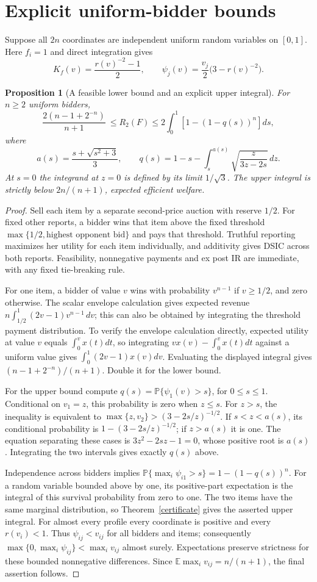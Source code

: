 \documentclass[11pt]{article}
\newtheorem{proposition}[theorem]{Proposition}
\theoremstyle{definition}
\newcommand{\E}{\mathbb E}
\newcommand{\Prb}{\mathbb P}
\begin{document}
\section{Explicit uniform-bidder bounds}
Suppose all $2n$ coordinates are independent uniform random variables on
$[0,1]$. Here $f_i=1$ and direct integration gives
\[
 K_f(v)=\frac{r(v)^{-2}-1}{2},\qquad
 \psi_j(v)=\frac{v_j}{2}\bigl(3-r(v)^{-2}\bigr).
\]
\begin{proposition}[A feasible lower bound and an explicit upper integral]
For $n\ge2$ uniform bidders,
\[
 \frac{2(n-1+2^{-n})}{n+1}\ \le R_2(F)\le
 2\int_0^1\left[1-(1-q(s))^n\right]ds,
\]
where
\[
 a(s)=\frac{s+\sqrt{s^2+3}}3,
 \qquad q(s)=1-s-\int_s^{a(s)}\sqrt{\frac{z}{3z-2s}}\,dz.
\]
At $s=0$ the integrand at $z=0$ is defined by its limit $1/\sqrt3$.
The upper integral is strictly below $2n/(n+1)$, expected efficient welfare.
\end{proposition}
\begin{proof}
Sell each item by a separate second-price auction with reserve $1/2$.
For fixed other reports, a bidder wins that item above the fixed threshold
$\max\{1/2,\text{highest opponent bid}\}$ and pays that threshold.
Truthful reporting maximizes her utility for each item individually,
and additivity gives DSIC across both reports. Feasibility, nonnegative
payments and ex post IR are immediate, with any fixed tie-breaking rule.

For one item, a bidder of value $v$ wins with probability $v^{n-1}$ if
$v\ge1/2$, and zero otherwise. The scalar envelope calculation gives
expected revenue $n\int_{1/2}^1(2v-1)v^{n-1}\,dv$; this can also be
obtained by integrating the threshold payment distribution. To verify
the envelope calculation directly, expected utility at value $v$ equals
$\int_0^v x(t)dt$, so integrating $vx(v)-\int_0^v x(t)dt$ against a
uniform value gives $\int_0^1(2v-1)x(v)dv$. Evaluating the displayed
integral gives $(n-1+2^{-n})/(n+1)$. Double it for the lower bound.

For the upper bound compute $q(s)=\Prb\{\psi_1(v)>s\}$, for $0\le s\le1$.
Conditional on $v_1=z$, this probability is zero when $z\le s$.
For $z>s$, the inequality is equivalent to
$\max\{z,v_2\}>(3-2s/z)^{-1/2}$. If $s<z<a(s)$, its conditional
probability is $1-(3-2s/z)^{-1/2}$; if $z>a(s)$ it is one.
The equation separating these cases is $3z^2-2sz-1=0$, whose positive
root is $a(s)$. Integrating the two intervals gives exactly $q(s)$ above.

Independence across bidders implies
$\Prb\{\max_i\psi_{i1}>s\}=1-(1-q(s))^n$.
For a random variable bounded above by one, its positive-part expectation
is the integral of this survival probability from zero to one. The two
items have the same marginal distribution, so Theorem~\ref{certificate}
gives the asserted upper integral. For almost every profile every
coordinate is positive and every $r(v_i)<1$. Thus $\psi_{ij}<v_{ij}$
for all bidders and items; consequently
$\max\{0,\max_i\psi_{ij}\}<\max_i v_{ij}$ almost surely. Expectations
preserve strictness for these bounded nonnegative differences. Since
$\E\max_i v_{ij}=n/(n+1)$, the final assertion follows.
\end{proof}
\end{document}
